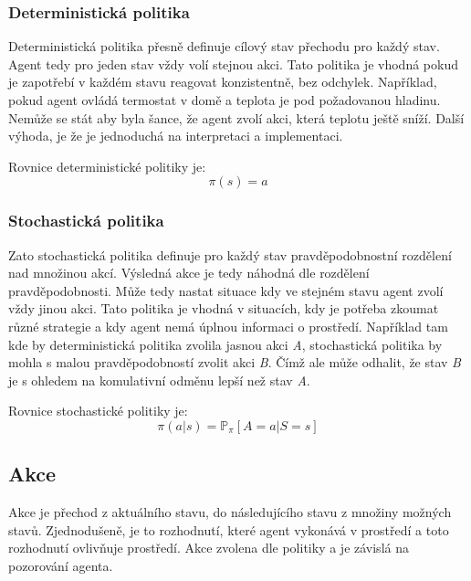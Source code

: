   \subsubsection*{Deterministická politika}
  
  Deterministická politika přesně definuje cílový stav přechodu pro každý stav.
  Agent tedy pro jeden stav vždy volí stejnou akci.
  Tato politika je vhodná pokud je zapotřebí v každém stavu reagovat konzistentně, bez odchylek.
  Například, pokud agent ovládá termostat v domě a teplota je pod požadovanou hladinu.
  Nemůže se stát aby byla šance, že agent zvolí akci, která teplotu ještě sníží.
  Další výhoda, je že je jednoduchá na interpretaci a implementaci.\cite{Policies}

  Rovnice deterministické politiky je:
  \begin{equation}
    \pi(s) = a
  \end{equation}

  \subsubsection*{Stochastická politika}
  
  Zato stochastická politika definuje pro každý stav pravděpodobnostní rozdělení nad množinou akcí.
  Výsledná akce je tedy náhodná dle rozdělení pravděpodobnosti.
  Může tedy nastat situace kdy ve stejném stavu agent zvolí vždy jinou akci.
  Tato politika je vhodná v situacích, kdy je potřeba zkoumat různé strategie a kdy agent nemá úplnou informaci o prostředí.
  Například tam kde by deterministická politika zvolila jasnou akci \textit{A}, stochastická politika by mohla  s malou pravděpodobností zvolit akci \textit{B}.
  Čímž ale může odhalit, že stav \textit{B} je s ohledem na komulativní odměnu lepší než stav \textit{A}.\cite{Policies}

  Rovnice stochastické politiky je:
  \begin{equation}
    \pi(a \vert s) = \mathbb{P}_\pi [A=a \vert S=s]
  \end{equation}

  \subsection{Akce}

  Akce je přechod z aktuálního stavu, do následujícího stavu z množiny možných stavů.
  Zjednodušeně, je to rozhodnutí, které agent vykonává v prostředí a toto rozhodnutí ovlivňuje prostředí.
  Akce zvolena dle politiky a je závislá na pozorování agenta.
  
